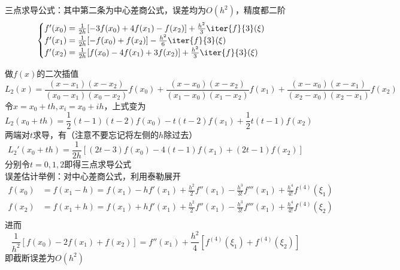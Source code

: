 三点求导公式：其中第二条为中心差商公式，误差均为$O(h^2)$，精度都二阶
\[\begin{cases}
    f'(x_0)=\frac{1}{2h}[-3f(x_0)+4f(x_1)-f(x_2)]+\frac{h^2}{3}\iter{f}{3}(\xi)\\
    f'(x_1)=\frac{1}{2h}[-f(x_0)+f(x_2)]-\frac{h^2}{6}\iter{f}{3}(\xi)\\
    f'(x_2)=\frac{1}{2h}[f(x_0)-4f(x_1)+3f(x_2)]+\frac{h^2}{3}\iter{f}{3}(\xi)
\end{cases}\]
\begin{analysis}
    做$f(x)$的二次插值
    \[L_2(x)=\frac{(x-x_1)(x-x_2)}{(x_0-x_1)(x_0-x_2)}f(x_0)+\frac{(x-x_0)(x-x_2)}{(x_1-x_0)(x_1-x_2)}f(x_1)+\frac{(x-x_0)(x-x_1)}{(x_2-x_0)(x_2-x_1)}f(x_2)\]
    令$x=x_0+th,x_i=x_0+ih$，上式变为
    \[L_2(x_0+th)=\frac{1}{2}(t-1)(t-2)f(x_0)-t(t-2)f(x_1)+\frac{1}{2}t(t-1)f(x_2)\]
    两端对$t$求导，有（注意不要忘记将左侧的$h$除过去）
    \[L_2'(x_0+th)=\frac{1}{2h}[(2t-3)f(x_0)-4(t-1)f(x_1)+(2t-1)f(x_2)]\]
    分别令$t=0,1,2$即得三点求导公式\\
    误差估计举例：对中心差商公式，利用泰勒展开
    \[\begin{aligned}
        f(x_0)&=f(x_1-h)=f(x_1)-hf'(x_1)+\frac{h^2}{2}f''(x_1)-\frac{h^3}{3!}f'''(x_1)+\frac{h^4}{4!}f^{(4)}(\xi_1)\\
        f(x_2)&=f(x_1+h)=f(x_1)+hf'(x_1)+\frac{h^2}{2}f''(x_1)-\frac{h^3}{3!}f'''(x_1)+\frac{h^4}{4!}f^{(4)}(\xi_2)\\
    \end{aligned}\]
    进而
    \[\frac{1}{h^2}[f(x_0)-2f(x_1)+f(x_2)]=f''(x_1)+\frac{h^2}{4}[f^{(4)}(\xi_1)+f^{(4)}(\xi_2)]\]
    即截断误差为$O(h^2)$
\end{analysis}